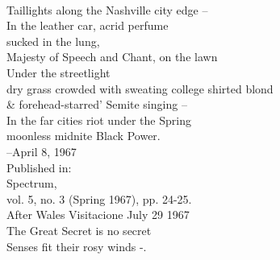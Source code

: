 \documentclass[smalldemyvopaper,11pt,twoside,onecolumn,openright,extrafontsizes]{memoir}
\begin{document}
\\Taillights along the Nashville city edge --
\\In the leather car, acrid perfume
\\sucked in the lung,
\\Majesty of Speech and Chant, on the lawn
\\Under the streetlight
\\dry grass crowded with sweating college shirted blond
\\\& forehead-starred' Semite singing --
\\In the far cities riot under the Spring
\\moonless midnite Black Power.
\\--April 8, 1967
\\Published in:
\\Spectrum,
\\vol. 5, no. 3 (Spring 1967), pp. 24-25.
\\After Wales Visitacione July 29 1967
\\The Great Secret is no secret
\\Senses fit their rosy winds -.
\end{document}
